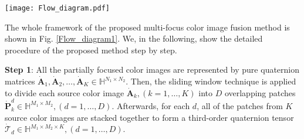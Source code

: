 \documentclass[journal]{IEEEtran}
\begin{document}
\begin{figure*}[htbp]
	\centering
	\texttt{[image: Flow\_diagram.pdf]}
	\caption{The flowchart of multi-focus color image fusion by QHOSVD.}
	\label{Flow_diagram1}
\end{figure*}

The whole framework of the proposed multi-focus color image fusion method is shown in Fig. \ref{Flow_diagram1}. We, in the following, show the detailed procedure of the proposed method step by step.

\textbf{Step 1}: All the partially focused color images are represented by pure quaternion matrices $\dot{\mathbf{A}}_{1}, \dot{\mathbf{A}}_{2}, \ldots, \dot{\mathbf{A}}_{K}\in\mathbb{H}^{N_{1}\times N_{2}}$. Then, the sliding window technique is applied to divide each
source color image $\dot{\mathbf{A}}_{k}, (k=1, \ldots, K)$ into $D$ overlapping patches $\dot{\mathbf{P}}_{k}^{d}\in\mathbb{H}^{M_{1}\times M_{2}}, (d=1, \ldots, D)$. Afterwards, for each $d$, all of the patches from $K$ source color images are stacked together to form a third-order quaternion tensor $\dot{\mathcal{T}}_{d}\in\mathbb{H}^{M_{1}\times M_{2}\times K}, (d=1, \ldots, D)$.
\end{document}
